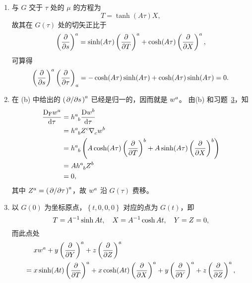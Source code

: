 \begin{xiti}
\begin{zm}
\begin{enumerate}[label=(\alph*)]
				\item 与 $G$ 交于 $\tau$ 处的 $\mu$ 的方程为
				\begin{equation*}
					T = \tanh(A\tau) X,
				\end{equation*}
				故其在 $G(\tau)$ 处的切矢正比于
				\begin{equation*}
					\tensor{\left( \pdv{s} \right)}{^a} = \sinh(A\tau)\tensor{\left( \pdv{T} \right)}{^a} + \cosh(A\tau) \tensor{\left( \pdv{X} \right)}{^a},
				\end{equation*}
				可算得
				\begin{equation*}
					\tensor{\left( \pdv{s} \right)}{^a} \tensor{\left( \pdv{\tau} \right)}{_a} = - \cosh(A\tau) \sinh(A\tau) + \cosh(A\tau) \sinh(A\tau) =0.
				\end{equation*}
				\item 在 (b) 中给出的 $\tensor{\left( \pdv*{s} \right)}{^a}$ 已经是归一的，因而就是 $\tensor{w}{^a}$。
				由(b) 和习题~\hyperref[prob-7.3]{3}，知
				\begin{equation*}
					\begin{split}
						\Fd{\tensor{w}{^a}} &= \tensor{h}{^a_b} \Dd{\tensor{w}{^b}}\\
						&= \tensor{h}{^a_b} \tensor{Z}{^c} \Nabla{c} \tensor{w}{^b}\\
						&= \tensor{h}{^a_b} \left( A \cosh(A\tau) \tensor{\left( \pdv{T} \right)}{^b} + A \sinh(A\tau) \tensor{\left( \pdv{X} \right)}{^b} \right)\\
						&= A \tensor{h}{^a_b} \tensor{Z}{^b}\\
						&= 0,
					\end{split}
				\end{equation*}
				其中 $\tensor{Z}{^a} = \tensor{\left( \pdv*{\tau} \right)}{^a}$，故 $\tensor{w}{^a}$ 沿 $G(\tau)$ 费移。
				\item 以 $G(0)$ 为坐标原点，$\left\{ t,0,0,0\right\}$ 对应的点为 $G(t)$，即
				\begin{equation*}
					T= A^{-1} \sinh A t \qc X= A^{-1} \cosh A t \qc Y = Z =0,
				\end{equation*}
				而此点处
				\begin{equation*}
					\begin{split}
						&x\tensor{w}{^a} + y \tensor{\left( \pdv{Y} \right)}{^a} + z \tensor{\left( \pdv{Z} \right)}{^a}\\
						={}& x \sinh(At) \tensor{\left( \pdv{T} \right)}{^a} + x \cosh(At) \tensor{\left( \pdv{X} \right)}{^a} + y \tensor{\left( \pdv{Y} \right)}{^a} + z \tensor{\left( \pdv{Z} \right)}{^a},

\end{split}
\end{equation*}
\end{enumerate}
\end{zm}
\end{xiti}
